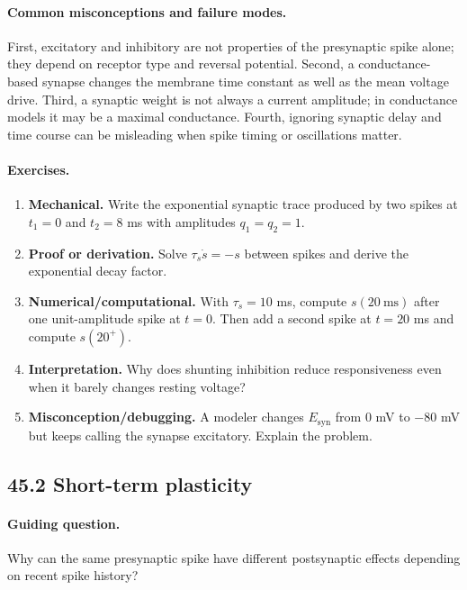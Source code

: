 \paragraph{Common misconceptions and failure modes.}
First, excitatory and inhibitory are not properties of the presynaptic spike alone; they depend on receptor type and reversal potential. Second, a conductance-based synapse changes the membrane time constant as well as the mean voltage drive. Third, a synaptic weight is not always a current amplitude; in conductance models it may be a maximal conductance. Fourth, ignoring synaptic delay and time course can be misleading when spike timing or oscillations matter.

\paragraph{Exercises.}
\begin{enumerate}[label=\textbf{45.1.\arabic*.}, leftmargin=*]
\item \textbf{Mechanical.} Write the exponential synaptic trace produced by two spikes at \(t_1=0\) and \(t_2=8\) ms with amplitudes \(q_1=q_2=1\).
\item \textbf{Proof or derivation.} Solve \(\tau_s\dot s=-s\) between spikes and derive the exponential decay factor.
\item \textbf{Numerical/computational.} With \(\tau_s=10\) ms, compute \(s(20\ \mathrm{ms})\) after one unit-amplitude spike at \(t=0\). Then add a second spike at \(t=20\) ms and compute \(s(20^+)\).
\item \textbf{Interpretation.} Why does shunting inhibition reduce responsiveness even when it barely changes resting voltage?
\item \textbf{Misconception/debugging.} A modeler changes \(E_{\mathrm{syn}}\) from \(0\) mV to \(-80\) mV but keeps calling the synapse excitatory. Explain the problem.
\end{enumerate}

\subsection{45.2 Short-term plasticity}

\paragraph{Guiding question.}
Why can the same presynaptic spike have different postsynaptic effects depending on recent spike history?

